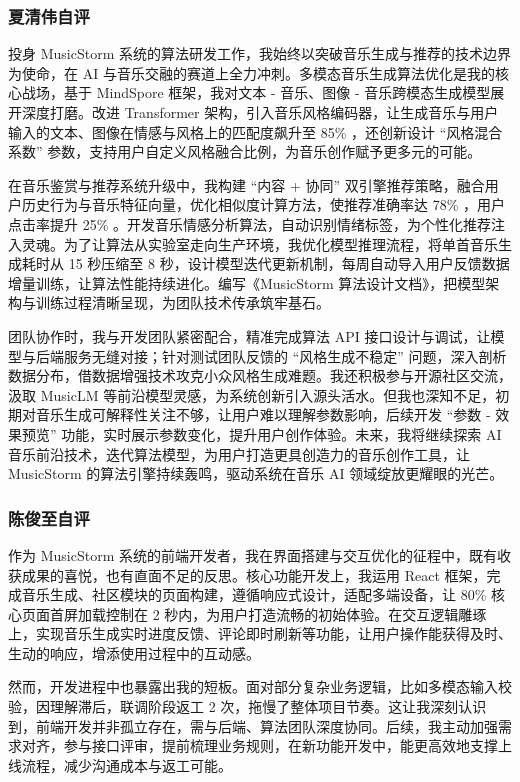 \documentclass{base}
\numberwithin{figure}{section} %
\begin{document}
\newpage
\subsubsection{夏清伟自评}

投身 MusicStorm 系统的算法研发工作，我始终以突破音乐生成与推荐的技术边界为使命，在 AI 与音乐交融的赛道上全力冲刺。多模态音乐生成算法优化是我的核心战场，基于 MindSpore 框架，我对文本 - 音乐、图像 - 音乐跨模态生成模型展开深度打磨。改进 Transformer 架构，引入音乐风格编码器，让生成音乐与用户输入的文本、图像在情感与风格上的匹配度飙升至 85\% ，还创新设计 “风格混合系数” 参数，支持用户自定义风格融合比例，为音乐创作赋予更多元的可能。

在音乐鉴赏与推荐系统升级中，我构建 “内容 + 协同” 双引擎推荐策略，融合用户历史行为与音乐特征向量，优化相似度计算方法，使推荐准确率达 78\% ，用户点击率提升 25\% 。开发音乐情感分析算法，自动识别情绪标签，为个性化推荐注入灵魂。为了让算法从实验室走向生产环境，我优化模型推理流程，将单首音乐生成耗时从 15 秒压缩至 8 秒，设计模型迭代更新机制，每周自动导入用户反馈数据增量训练，让算法性能持续进化。编写《MusicStorm 算法设计文档》，把模型架构与训练过程清晰呈现，为团队技术传承筑牢基石。

团队协作时，我与开发团队紧密配合，精准完成算法 API 接口设计与调试，让模型与后端服务无缝对接；针对测试团队反馈的 “风格生成不稳定” 问题，深入剖析数据分布，借数据增强技术攻克小众风格生成难题。我还积极参与开源社区交流，汲取 MusicLM 等前沿模型灵感，为系统创新引入源头活水。但我也深知不足，初期对音乐生成可解释性关注不够，让用户难以理解参数影响，后续开发 “参数 - 效果预览” 功能，实时展示参数变化，提升用户创作体验。未来，我将继续探索 AI 音乐前沿技术，迭代算法模型，为用户打造更具创造力的音乐创作工具，让 MusicStorm 的算法引擎持续轰鸣，驱动系统在音乐 AI 领域绽放更耀眼的光芒。

\newpage
\subsubsection{陈俊至自评}

作为 MusicStorm 系统的前端开发者，我在界面搭建与交互优化的征程中，既有收获成果的喜悦，也有直面不足的反思。核心功能开发上，我运用 React 框架，完成音乐生成、社区模块的页面构建，遵循响应式设计，适配多端设备，让 80\% 核心页面首屏加载控制在 2 秒内，为用户打造流畅的初始体验。在交互逻辑雕琢上，实现音乐生成实时进度反馈、评论即时刷新等功能，让用户操作能获得及时、生动的响应，增添使用过程中的互动感。

然而，开发进程中也暴露出我的短板。面对部分复杂业务逻辑，比如多模态输入校验，因理解滞后，联调阶段返工 2 次，拖慢了整体项目节奏。这让我深刻认识到，前端开发并非孤立存在，需与后端、算法团队深度协同。后续，我主动加强需求对齐，参与接口评审，提前梳理业务规则，在新功能开发中，能更高效地支撑上线流程，减少沟通成本与返工可能。
\end{document}
